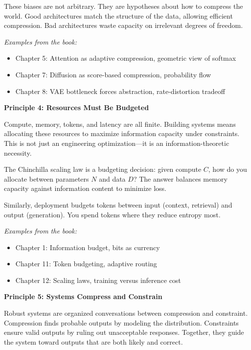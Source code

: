 These biases are not arbitrary. They are hypotheses about how to compress the world. Good architectures match the structure of the data, allowing efficient compression. Bad architectures waste capacity on irrelevant degrees of freedom.

\textit{Examples from the book:}
\begin{itemize}
\item Chapter 5: Attention as adaptive compression, geometric view of softmax
\item Chapter 7: Diffusion as score-based compression, probability flow
\item Chapter 8: VAE bottleneck forces abstraction, rate-distortion tradeoff
\end{itemize}

\vspace{0.5em}

\textbf{Principle 4: Resources Must Be Budgeted}

Compute, memory, tokens, and latency are all finite. Building systems means allocating these resources to maximize information capacity under constraints. This is not just an engineering optimization---it is an information-theoretic necessity.

The Chinchilla scaling law is a budgeting decision: given compute $C$, how do you allocate between parameters $N$ and data $D$? The answer balances memory capacity against information content to minimize loss.

Similarly, deployment budgets tokens between input (context, retrieval) and output (generation). You spend tokens where they reduce entropy most.

\textit{Examples from the book:}
\begin{itemize}
\item Chapter 1: Information budget, bits as currency
\item Chapter 11: Token budgeting, adaptive routing
\item Chapter 12: Scaling laws, training versus inference cost
\end{itemize}

\vspace{0.5em}

\textbf{Principle 5: Systems Compress and Constrain}

Robust systems are organized conversations between compression and constraint. Compression finds probable outputs by modeling the distribution. Constraints ensure valid outputs by ruling out unacceptable responses. Together, they guide the system toward outputs that are both likely and correct.

